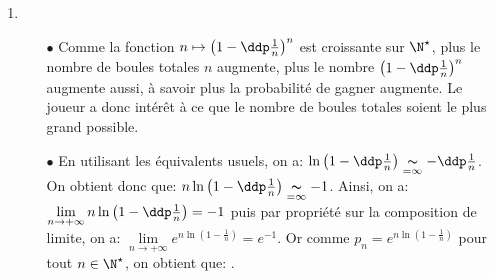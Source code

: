 \begin{correction}
\begin{enumerate}
\item 
\begin{itemize}
\item[$\bullet$] Comme la fonction $n\mapsto \left(1- \ddp\frac{1}{n} \right)^n$ est croissante sur $\N^{\star}$, plus le nombre de boules totales $n$ augmente, plus le nombre $\left(1- \ddp\frac{1}{n} \right)^n$ augmente aussi, \`{a} savoir plus la probabilit\'e de gagner augmente. Le joueur a donc int\'er\^{e}t \`{a} ce que le nombre de boules totales soient le plus grand possible. 
\item[$\bullet$] En utilisant les \'equivalents usuels, on a: $\ln{\left(1- \ddp\frac{1}{n} \right)}\underset{=\infty}{\thicksim} -\ddp\frac{1}{n}$. On obtient donc que: $n\ln{\left(1- \ddp\frac{1}{n} \right)}\underset{=\infty}{\thicksim} -1$. Ainsi, on a: $\lim\limits_{n\to +\infty} n\ln{\left(1- \ddp\frac{1}{n} \right)}=-1$ puis par propri\'et\'e sur la composition de limite, on a: $\lim\limits_{n\to +\infty} e^{n\ln{\left(1- \frac{1}{n} \right)}}=e^{-1}$. Or comme $p_n=e^{n\ln{\left(1- \frac{1}{n} \right)}}$ pour tout $n\in\N^{\star}$, on obtient que: .  
\end{itemize}
\end{enumerate}
\end{correction}









